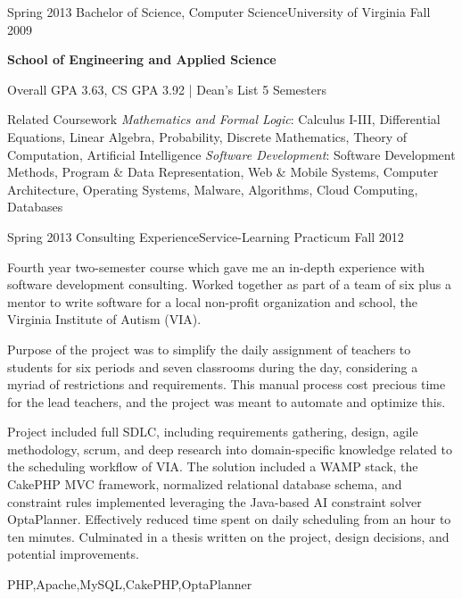 \begin{scholarship}
  \experience
    {Spring 2013}   {Bachelor of Science, Computer Science}{University of Virginia}
    {Fall 2009}
                    {
                        \textbf{School of Engineering and Applied Science}

                        Overall GPA 3.63, CS GPA 3.92 | Dean's List 5 Semesters 

                        \ifcv
                        \textcolor{accentcolor}{Related Coursework}
                        \textit{Mathematics and Formal Logic}: Calculus I-III, Differential Equations, Linear Algebra, Probability, Discrete Mathematics, Theory of Computation, Artificial Intelligence
                        \textit{Software Development}: Software Development Methods, Program \& Data Representation, Web \& Mobile Systems, Computer Architecture, Operating Systems, Malware, Algorithms, Cloud Computing, Databases
                        \fi
                    }
                    {}
\end{scholarship}

\begin{scholarship}
\ifcv
  \experience
    {Spring 2013}  {Consulting Experience}{Service-Learning Practicum}
    {Fall 2012}    {
                        Fourth year two-semester course which gave me an in-depth experience with software development consulting. Worked together as part of a team of six plus a mentor to write software for a local non-profit organization and school, the Virginia Institute of Autism (VIA).

                        \vspace{0.5em}

                        Purpose of the project was to simplify the daily assignment of teachers to students for six periods and seven classrooms during the day, considering a myriad of restrictions and requirements. This manual process cost precious time for the lead teachers, and the project was meant to automate and optimize this.

                        \vspace{0.5em}

                        Project included full SDLC, including requirements gathering, design, agile methodology, scrum, and deep research into domain-specific knowledge related to the scheduling workflow of VIA. The solution included a WAMP stack, the CakePHP MVC framework, normalized relational database schema, and constraint rules implemented leveraging the Java-based AI constraint solver OptaPlanner. Effectively reduced time spent on daily scheduling from an hour to ten minutes. Culminated in a thesis written on the project, design decisions, and potential improvements.
                    }
                    {PHP,Apache,MySQL,CakePHP,OptaPlanner}
\fi
\end{scholarship}
\filbreak
